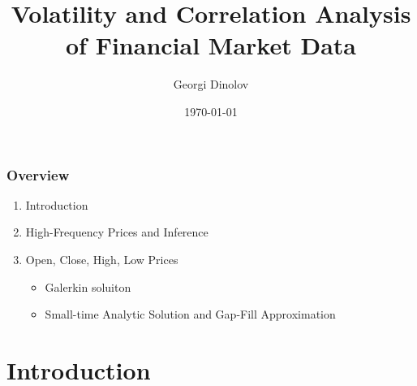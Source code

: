 \documentclass{beamer}
\title[]{Volatility and Correlation Analysis of Financial Market Data} %
\author{Georgi Dinolov} %
\institute[UCSC] %
{
University of California, Santa Cruz \\ %
\medskip
\textit{gdinolov@soe.ucsc.edu} %
}
\date{\today} %
\begin{document}
\begin{frame}
\titlepage %
\end{frame}

\begin{frame}
\frametitle{Overview} %
\begin{enumerate}
\item Introduction
\item High-Frequency Prices and Inference
\item Open, Close, High, Low Prices
  \begin{itemize}
  \item Galerkin soluiton
  \item Small-time Analytic Solution and Gap-Fill Approximation
  \end{itemize}
\end{enumerate}
\end{frame}


\section{Introduction}
\end{document}
